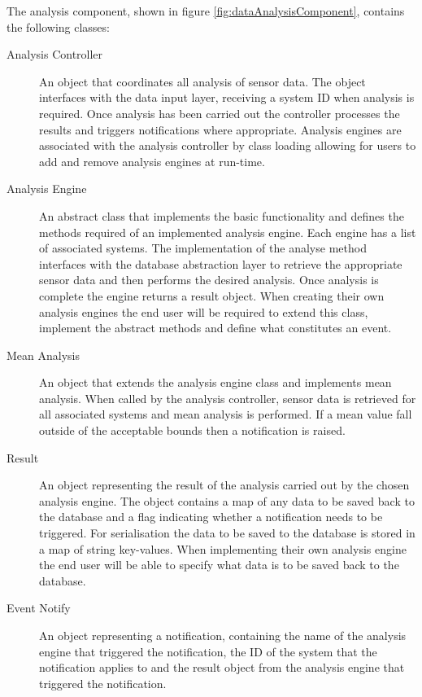 \documentclass[10pt,a4paper]{article}
\begin{document}
The analysis component, shown in figure
\ref{fig:dataAnalysisComponent}, contains the following classes:

\begin{description}
  \item [Analysis Controller] An object that coordinates all analysis of
    sensor data. The object interfaces with the data input layer,
    receiving a system ID when analysis is required. Once analysis has
    been carried out the controller processes the results and triggers
    notifications where appropriate. Analysis engines are associated
    with the analysis controller by class loading allowing for users to
    add and remove analysis engines at run-time.

  \item [Analysis Engine] An abstract class that implements the basic
    functionality and defines the methods required of an implemented
    analysis engine. Each engine has a list of associated systems. The
    implementation of the analyse method interfaces with the database
    abstraction layer to retrieve the appropriate sensor data and then
    performs the desired analysis. Once analysis is complete the engine 
    returns a result object. When creating their own analysis 
    engines the end user will be required to extend this class, implement 
    the abstract methods and define what constitutes an event.

  \item [Mean Analysis] An object that extends the analysis engine
    class and implements mean analysis. When called by the analysis
    controller, sensor data is retrieved for all associated systems
    and mean analysis is performed. If a mean value fall outside of
    the acceptable bounds then a notification is raised.

  \item [Result] An object representing the result of the analysis
    carried out by the chosen analysis engine. The object contains a
    map of any data to be saved back to the database and a flag
    indicating whether a notification needs to be triggered. For
    serialisation the data to be saved to the database is stored in a
    map of string key-values. When implementing their own analysis
    engine the end user will be able to specify what data is to be
    saved back to the database.

  \item [Event Notify] An object representing a notification,
    containing the name of the analysis engine that triggered the
    notification, the ID of the system that the notification applies
    to and the result object from the analysis engine that triggered
    the notification.
\end{description}
\end{document}
